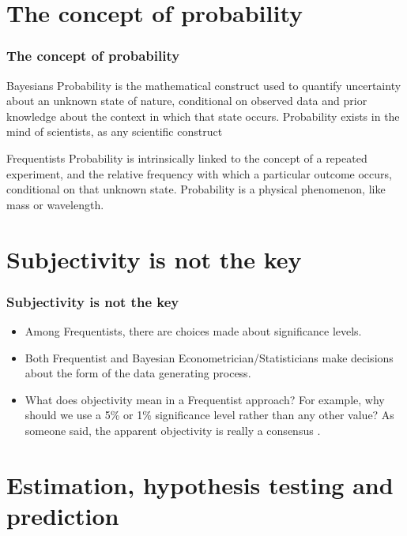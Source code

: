 \documentclass[12pt, compress]{beamer}
\begin{document}
\section{The concept of probability}

\begin{frame}
	\frametitle{The concept of probability}
	\begin{block}{Bayesians}
	Probability is the mathematical construct used to quantify uncertainty about an unknown state of nature, conditional on observed data and prior knowledge about the context in which that state occurs. Probability exists in the mind of scientists, as any scientific construct \citep{Parmigiani2008}
	\end{block}

	\begin{block}{Frequentists}
	Probability is intrinsically linked to the concept of a repeated experiment, and the relative frequency with which a particular outcome occurs, conditional on that unknown state. Probability is a physical phenomenon, like mass or wavelength. 
\end{block}

\end{frame}

\section{Subjectivity is not the key}

\begin{frame}
	\frametitle{Subjectivity is not the key}
	\begin{itemize}
		\item Among Frequentists, there are choices made about significance levels.
		\item Both Frequentist and Bayesian Econometrician/Statisticians make decisions about the form of the data generating process.
		\item What does objectivity mean in a Frequentist approach? For example, why should we use a 5\% or 1\% significance level rather than any other value? As someone said, the apparent objectivity is really a consensus \citep{Lindley2000}.  
	\end{itemize}
 
\end{frame}

\section{Estimation, hypothesis testing and prediction}
\end{document}
